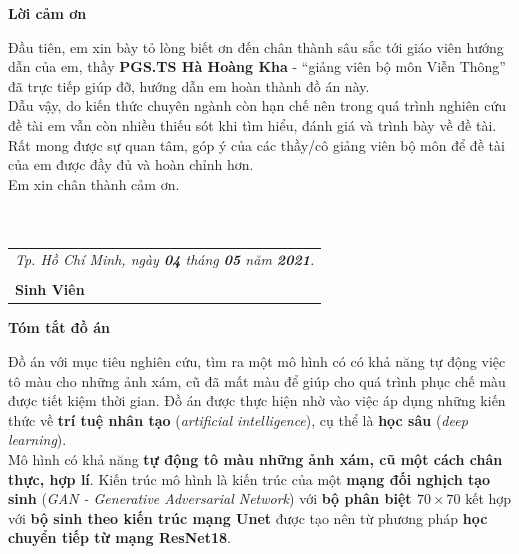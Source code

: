 \documentclass[a4paper]{article}
\begin{document}
\newpage

\begin{center}
\huge
\textbf{Lời cảm ơn}
\end{center}

\indent
Đầu tiên, em xin bày tỏ lòng biết ơn đến chân thành sâu sắc tới giáo viên hướng dẫn của em, thầy \textbf{PGS.TS Hà Hoàng Kha} - ``giảng viên bộ môn Viễn Thông'' đã trực tiếp giúp đỡ, hướng dẫn em hoàn thành đồ án này.\\

Dẫu vậy, do kiến thức chuyên ngành còn hạn chế nên trong quá trình nghiên cứu đề tài em vẫn còn nhiều thiếu sót khi tìm hiểu, đánh giá và trình bày về đề tài. Rất mong được sự quan tâm, góp ý của các thầy/cô giảng viên bộ môn để đề tài của em được đầy đủ và hoàn chỉnh hơn.\\


Em xin chân thành cảm ơn.\\\\\\

\hfill
\begin{tabular}{l@{}}
\textit{Tp. Hồ Chí Minh, ngày \textbf{04} tháng \textbf{05} năm \textbf{2021}.}\\\\
\hspace{3cm}\textbf{Sinh Viên}
\end{tabular}

\newpage

\begin{center}
\huge
\textbf{Tóm tắt đồ án}
\end{center}

\indent
Đồ án với mục tiêu nghiên cứu, tìm ra một mô hình có có khả năng tự động việc tô màu cho những ảnh xám, cũ đã mất màu để giúp cho quá trình phục chế màu được tiết kiệm thời gian. Đồ án được thực hiện nhờ vào việc áp dụng những kiến thức về \textbf{trí tuệ nhân tạo} (\textit{artificial intelligence}), cụ thể là \textbf{học sâu} (\textit{deep learning}).\\

Mô hình có khả năng \textbf{tự động tô màu những ảnh xám, cũ một cách chân thực, hợp lí}. Kiến trúc mô hình là kiến trúc của một \textbf{mạng đối nghịch tạo sinh} (\textit{GAN - Generative Adversarial Network}) với \textbf{bộ phân biệt $70 \times 70$} kết hợp với \textbf{bộ sinh theo kiến trúc mạng Unet} được tạo nên từ phương pháp \textbf{học chuyển tiếp từ mạng ResNet18}.
\end{document}
